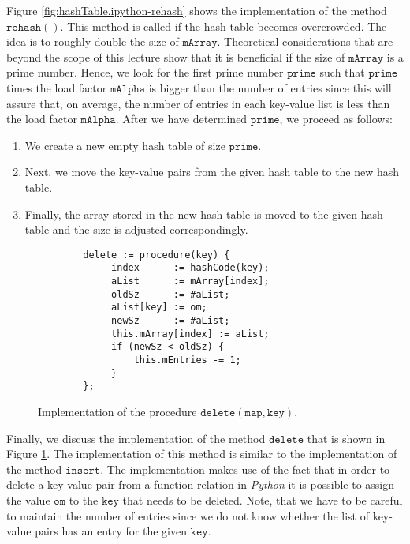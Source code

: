Figure \ref{fig:hashTable.ipython-rehash} shows the implementation of the method
$\texttt{rehash}()$.  This method is called if the hash table becomes overcrowded.  The idea is to
roughly double the size of $\texttt{mArray}$.  Theoretical considerations that are  beyond the scope
of this lecture show that it is beneficial if the size of $\texttt{mArray}$ is a prime number.
Hence, we look for the first prime number $\texttt{prime}$ such that $\texttt{prime}$ times the load
factor $\texttt{mAlpha}$ is bigger than the
number of entries since this will assure that, on average, the number of entries in each key-value
list is less than the load factor $\texttt{mAlpha}$.  After we have determined $\texttt{prime}$, we
proceed as follows: 
\begin{enumerate}
\item We create a new empty hash table of size $\texttt{prime}$.
\item Next, we move the key-value pairs from the given hash table to the new hash table.
\item Finally, the array stored in the new hash table is moved to the given hash table
      and the size is adjusted correspondingly.
\end{enumerate}





\begin{figure}[!ht]
\centering
\begin{verbatim}
        delete := procedure(key) {
             index      := hashCode(key);
             aList      := mArray[index];
             oldSz      := #aList;
             aList[key] := om;
             newSz      := #aList;
             this.mArray[index] := aList;
             if (newSz < oldSz) {
                 this.mEntries -= 1;
             }    
        };
\end{verbatim}
\vspace*{-0.3cm}
\caption{Implementation of the procedure $\texttt{delete}(\texttt{map}, \texttt{key})$.}
\label{fig:hashTable.ipython-delete}
\end{figure}

Finally, we discuss the implementation of the method $\texttt{delete}$ that is shown in Figure
\ref{fig:hashTable.ipython-delete}.  The implementation of this method is similar to the implementation
of the method $\texttt{insert}$.   The implementation makes use of the fact that in order to delete
a key-value pair from a function relation in \textsl{Python} it is possible to assign the value
$\texttt{om}$ to the $\texttt{key}$ that needs to be deleted. Note, that we have to be careful to
maintain the number of entries since we do not know whether the list of key-value pairs has an entry
for the given $\texttt{key}$.

